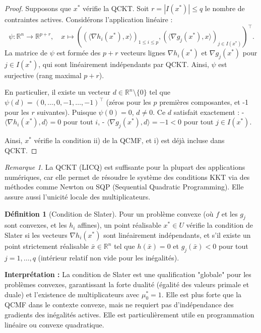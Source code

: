 \documentclass[a4paper,12pt,openany]{book}
\theoremstyle{plain}
\theoremstyle{definition}
\newtheorem{definition}[theorem]{Définition}
\theoremstyle{remark}
\newtheorem{remark}[theorem]{Remarque}
\theoremstyle{nbstyle}
\begin{document}
	\begin{proof}
		Supposons que \( x^* \) vérifie la QCKT. Soit \( r = |I(x^*)| \leq q \) le nombre de contraintes actives. Considérons l'application linéaire :
		\[
		\psi : \mathbb{R}^n \to \mathbb{R}^{p+r}, \quad x \mapsto \left( (\langle \nabla h_i(x^*), x \rangle)_{1 \leq i \leq p}, (\langle \nabla g_j(x^*), x \rangle)_{j \in I(x^*)} \right)^\top.
		\]
		La matrice de \( \psi \) est formée des \( p + r \) vecteurs lignes \( \nabla h_i(x^*) \) et \( \nabla g_j(x^*) \) pour \( j \in I(x^*) \), qui sont linéairement indépendants par QCKT. Ainsi, \( \psi \) est surjective (rang maximal \( p+r \)).
		
		En particulier, il existe un vecteur \( d \in \mathbb{R}^n \setminus \{0\} \) tel que \( \psi(d) = (0, \dots, 0, -1, \dots, -1)^\top \) (zéros pour les \( p \) premières composantes, et -1 pour les \( r \) suivantes). Puisque \( \psi(0) = 0 \), \( d \neq 0 \). Ce \( d \) satisfait exactement :
		- \( \langle \nabla h_i(x^*), d \rangle = 0 \) pour tout \( i \),
		- \( \langle \nabla g_j(x^*), d \rangle = -1 < 0 \) pour tout \( j \in I(x^*) \).
		
		Ainsi, \( x^* \) vérifie la condition ii) de la QCMF, et i) est déjà incluse dans QCKT.
	\end{proof}
	
	\begin{remark}
		La QCKT (LICQ) est suffisante pour la plupart des applications numériques, car elle permet de résoudre le système des conditions KKT via des méthodes comme Newton ou SQP (Sequential Quadratic Programming). Elle assure aussi l'unicité locale des multiplicateurs.
	\end{remark}
	
	\begin{definition}[Condition de Slater]
		Pour un problème convexe (où \( f \) et les \( g_j \) sont convexes, et les \( h_i \) affines), un point réalisable \( x^* \in U \) vérifie la condition de Slater si les vecteurs \( \nabla h_i(x^*) \) sont linéairement indépendants, et s'il existe un point strictement réalisable \( \bar{x} \in \mathbb{R}^n \) tel que \( h(\bar{x}) = 0 \) et \( g_j(\bar{x}) < 0 \) pour tout \( j = 1, \dots, q \) (intérieur relatif non vide pour les inégalités).
	\end{definition}
	
	\textbf{Interprétation :} La condition de Slater est une qualification "globale" pour les problèmes convexes, garantissant la forte dualité (égalité des valeurs primale et duale) et l'existence de multiplicateurs avec \( \mu_0^* = 1 \). Elle est plus forte que la QCMF dans le contexte convexe, mais ne requiert pas d'indépendance des gradients des inégalités actives. Elle est particulièrement utile en programmation linéaire ou convexe quadratique.
	
\end{document}

